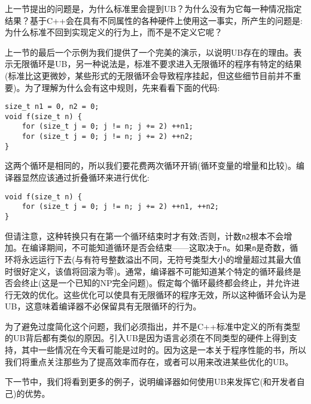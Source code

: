 上一节提出的问题是，为什么标准里会提到UB？为什么没有为它每一种情况指定结果？基于C++会在具有不同属性的各种硬件上使用这一事实，所产生的问题是:为什么标准不回到实现定义的行为上，而不是不定义它呢？

上一节的最后一个示例为我们提供了一个完美的演示，以说明UB存在的理由。表示无限循环是UB，另一种说法是，标准不要求进入无限循环的程序有特定的结果(标准比这更微妙，某些形式的无限循环会导致程序挂起，但这些细节目前并不重要)。为了理解为什么会有这中规则，先来看看下面的代码:

\begin{lstlisting}[style=styleCXX]
size_t n1 = 0, n2 = 0;
void f(size_t n) {
	for (size_t j = 0; j != n; j += 2) ++n1; 
	for (size_t j = 0; j != n; j += 2) ++n2;
}
\end{lstlisting}

这两个循环是相同的，所以我们要花费两次循环开销(循环变量的增量和比较)。编译器显然应该通过折叠循环来进行优化:

\begin{lstlisting}[style=styleCXX]
void f(size_t n) {
	for (size_t j = 0; j != n; j += 2) ++n1, ++n2;
}
\end{lstlisting}

但请注意，这种转换只有在第一个循环结束时才有效;否则，计数\texttt{n2}根本不会增加。在编译期间，不可能知道循环是否会结束——这取决于\texttt{n}。如果\texttt{n}是奇数，循环将永远运行下去(与有符号整数溢出不同，无符号类型大小的增量超过其最大值时很好定义，该值将回滚为零)。通常，编译器不可能知道某个特定的循环最终是否会终止(这是一个已知的NP完全问题)。假定每个循环最终都会终止，并允许进行无效的优化。这些优化可以使具有无限循环的程序无效，所以这种循环会认为是UB，这意味着编译器不必保留具有无限循环的行为。

为了避免过度简化这个问题，我们必须指出，并不是C++标准中定义的所有类型的UB背后都有类似的原因。引入UB是因为语言必须在不同类型的硬件上得到支持，其中一些情况在今天看可能是过时的。因为这是一本关于程序性能的书，所以我们将重点关注那些为了提高效率而存在，或者可以用来改进某些优化的UB。

下一节中，我们将看到更多的例子，说明编译器如何使用UB来发挥它(和开发者自己)的优势。




































